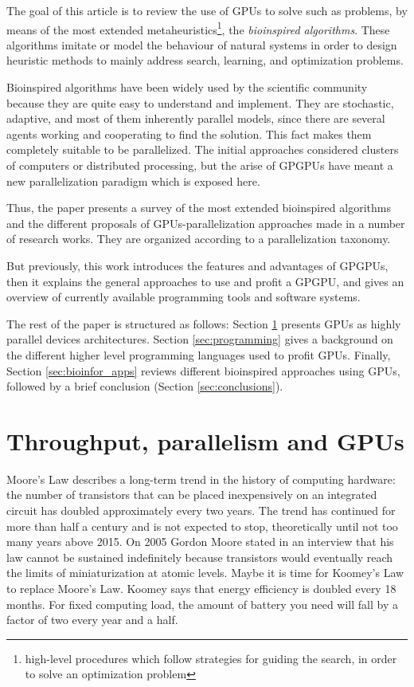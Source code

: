 \documentclass{comjnl}
\begin{document}
The goal of this article is to review the use of GPUs to solve such as problems, by means of the most extended metaheuristics\footnote{high-level procedures which follow strategies for guiding the search, in order to solve an optimization problem}, the \textit{bioinspired algorithms}. These algorithms imitate or model the behaviour of natural systems in order to design heuristic methods to mainly address search, learning, and optimization problems.

Bioinspired algorithms have been widely used by the scientific community because they are quite easy to understand and implement.
They are stochastic, adaptive, and most of them inherently parallel models, since there are several agents working and cooperating to find the solution. This fact makes them completely suitable to be parallelized. The initial approaches considered clusters of computers or distributed processing, but the arise of GPGPUs have meant a new parallelization paradigm which is exposed here.

Thus, the paper presents a survey of the most extended bioinspired algorithms and the different proposals of GPUs-parallelization approaches made in a number of research works. They are organized according to a parallelization taxonomy.

But previously, this work introduces the features and advantages of GPGPUs, then it explains the general approaches to use and profit a GPGPU, and gives an overview of currently available programming tools and software systems.

The rest of the paper is structured as follows: Section \ref{sec:parall_and_GPUs} presents GPUs as highly parallel devices architectures.
Section \ref{sec:programming} gives a background on the different higher level programming languages used to profit GPUs. Finally, Section \ref{sec:bioinfor_apps} reviews different bioinspired approaches using GPUs, followed by a brief conclusion (Section \ref{sec:conclusions}).

\section{Throughput, parallelism and GPUs}
\label{sec:parall_and_GPUs}

Moore's Law describes a long-term trend in the history of computing hardware: the number of transistors that can be placed inexpensively on an integrated circuit has doubled approximately every two years. The trend has continued for more than half a century and is not expected to stop, theoretically until not too many years above 2015. On 2005 Gordon Moore stated in an interview that his law cannot be sustained indefinitely because transistors would eventually reach the limits of miniaturization at atomic levels. Maybe it is time for Koomey's Law \cite{10.1109/MAHC.2010.28} to replace Moore's Law. Koomey says that energy efficiency is doubled every 18 months. For fixed computing load, the amount of battery you need will fall by a factor of two every year and a half.
\end{document}
